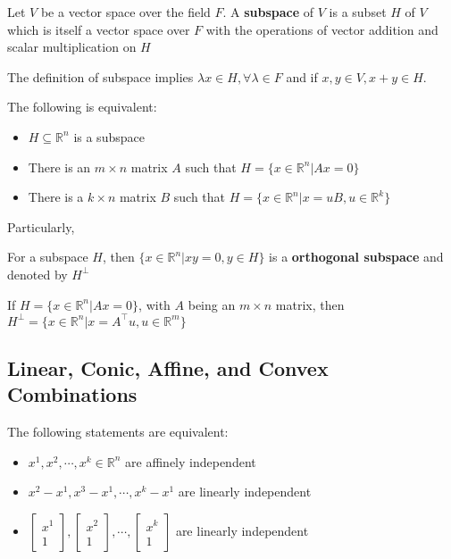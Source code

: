 					\begin{definition}[Subspace]
						Let $V$ be a vector space over the field $F$. A \textbf{subspace} of $V$ is a subset $H$ of $V$ which is itself a vector space over $F$ with the operations of vector addition and scalar multiplication on $H$
					\end{definition}

					The definition of subspace implies $\lambda x \in H, \forall \lambda \in F$ and if $x, y \in V, x + y \in H$.

					The following is equivalent:
					\begin{itemize}
						\item $H\subseteq \mathbb{R}^n$ is a subspace
						\item There is an $m \times n$ matrix $A$ such that $H = \{x \in \mathbb{R}^n | Ax = 0\}$
						\item There is a $k \times n$ matrix $B$ such that $H = \{x \in \mathbb{R}^n | x = uB, u \in \mathbb{R}^k\}$
					\end{itemize}

					Particularly, 
					\begin{definition}
						For a subspace $H$, then $\{x \in \mathbb{R}^n | xy = 0, y \in H\}$ is a \textbf{orthogonal subspace} and denoted by $H^{\perp}$
					\end{definition}
					
					\begin{proposition}
						If $H = \{x \in \mathbb{R}^n | Ax = 0\}$, with $A$ being an $m \times n$ matrix, then $H^{\perp} = \{x \in \mathbb{R}^n | x = A^{\top}u, u \in \mathbb{R}^m\}$
					\end{proposition}
		
				\subsection{Linear, Conic, Affine, and Convex Combinations}
					\begin{proposition}
						The following statements are equivalent:
						\begin{itemize}
							\item $x^1, x^2, \cdots, x^k \in \mathbb{R}^n$ are affinely independent
							\item $x^2 - x^1, x^3 - x^1, \cdots, x^k - x^1$ are linearly independent
							\item $\begin{bmatrix}x^1 \\ 1\end{bmatrix}, \begin{bmatrix}x^2 \\ 1\end{bmatrix}, \cdots, \begin{bmatrix}x^k \\ 1\end{bmatrix}$ are linearly independent
						\end{itemize}
					\end{proposition}				

